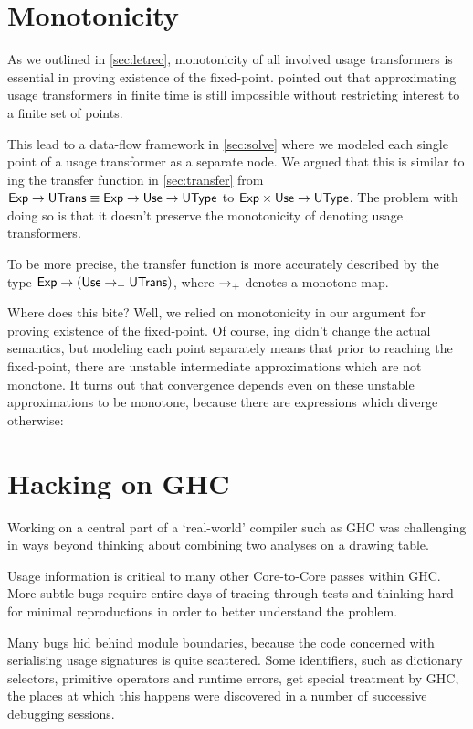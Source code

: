 \section{Monotonicity}\label{sec:mono}

As we outlined in \cref{sec:letrec}, monotonicity of all involved usage transformers is essential in proving existence of the fixed-point.
 pointed out that approximating usage transformers in finite time is still impossible without restricting interest to a finite set of points.

This lead to a data-flow framework in \cref{sec:solve} where we modeled each single point of a usage transformer as a separate node.
We argued that this is similar to ing the transfer function in \cref{sec:transfer} from $\text{\textsf{Exp}} \to \text{\textsf{UTrans}} \equiv \text{\textsf{Exp}} \to \text{\textsf{Use}} \to \text{\textsf{UType}}$ to $\text{\textsf{Exp}} \times \text{\textsf{Use}} \to \text{\textsf{UType}}$.
The problem with doing so is that it doesn't preserve the monotonicity of denoting usage transformers.

To be more precise, the transfer function is more accurately described by the type $\text{\textsf{Exp}} \to (\text{\textsf{Use}} \to_{+} \text{\textsf{UTrans}})$, where $\to_{+}$ denotes a monotone map.

Where does this bite?
Well, we relied on monotonicity in our argument for proving existence of the fixed-point.
Of course, ing didn't change the actual semantics, but modeling each point separately means that prior to reaching the fixed-point, there are unstable intermediate approximations which are not monotone.
It turns out that convergence depends even on these unstable approximations to be monotone, because there are expressions which diverge otherwise:


\section{Hacking on GHC}

Working on a central part of a `real-world' compiler such as GHC was challenging in ways beyond thinking about combining two analyses on a drawing table.

Usage information is critical to many other Core-to-Core passes within GHC\@.
More subtle bugs require entire days of tracing through tests and thinking hard for minimal reproductions in order to better understand the problem.

Many bugs hid behind module boundaries, because the code concerned with serialising usage signatures is quite scattered.
Some identifiers, such as dictionary selectors, primitive operators and runtime errors, get special treatment by GHC, the places at which this happens were discovered in a number of successive debugging sessions.

